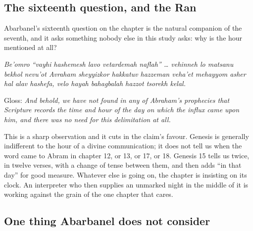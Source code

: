 \subsection{The sixteenth question, and the Ran}

Abarbanel's sixteenth question on the chapter is the natural companion of the
seventh, and it asks something nobody else in this study asks: why is the hour
mentioned at all?

\begin{studyframe}
\textit{Be'omro ``vayhi hashemesh lavo vetardemah
naflah'' \dots{} vehinneh lo matsanu bekhol nevu'ot Avraham sheyyizkor
hakkatuv hazzeman veha'et mehayyom asher hal alav hashefa, velo hayah
bahagbalah hazzot tsorekh kelal.}
\end{studyframe}

\noindent Gloss: \emph{And behold, we have not found in any of Abraham's
prophecies that Scripture records the time and hour of the day on which the
influx came upon him, and there was no need for this delimitation at all.}

This is a sharp observation and it cuts in the claim's favour. Genesis is
generally indifferent to the hour of a divine communication; it does not tell us
when the word came to Abram in chapter 12, or 13, or 17, or 18. Genesis 15 tells
us twice, in twelve verses, with a change of tense between them, and then adds
``in that day'' for good measure. Whatever else is going on, the chapter is
insisting on its clock. An interpreter who then supplies an unmarked night in
the middle of it is working against the grain of the one chapter that cares.

\subsection{One thing Abarbanel does not consider}

